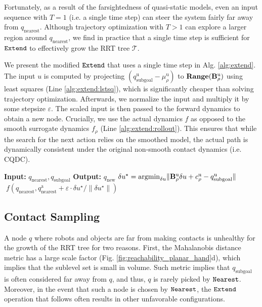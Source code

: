 Fortunately, as a result of the farsightedness of quasi-static models, even an input sequence with $T = 1$ (i.e. a single time step) can steer the system fairly far away from $q_{\mathrm{nearest}}$. Although trajectory optimization with $T > 1$ can explore a larger region around $q_{\mathrm{nearest}}$, we find in practice that a single time step is sufficient for $\mathtt{Extend}$ to effectively grow the RRT tree $\mathcal{T}$.

We present the modified $\mathtt{Extend}$ that uses a single time step in Alg. \ref{alg:extend}. The input $u$ is computed by projecting $(q^\mathrm{u}_{\mathrm{subgoal}} - \mu_\rho^\mathrm{u})$ to $\mathbf{Range}(\mathbf{B}^\mathrm{u}_\rho)$ using least squares (Line \ref{alg:extend:lstsq}), which is significantly cheaper than solving trajectory optimization. Afterwards, we normalize the input and multiply it by some stepsize $\varepsilon$. The scaled input is then passed to the forward dynamics to obtain a new node. Crucially, we use the actual dynamics $f$ as opposed to the smooth surrogate dynamics $f_\rho$ (Line \ref{alg:extend:rollout}). This ensures that while the search for the next action relies on the smoothed model, the actual path is dynamically consistent under the original non-smooth contact dynamics (i.e. CQDC). 

\begin{algorithm}
\caption{$\mathtt{Extend}$}\label{alg:extend}
\textbf{Input:} $q_{\mathrm{nearest}}, q_{\mathrm{subgoal}}$\;  \textbf{Output:} $q_{\mathrm{new}}$\;
$\delta u^\star = \mathrm{argmin}_{\delta u} \|\mathbf{B}^\mathrm{u}_\rho \delta u + c_\rho^\mathrm{u} - q_{\mathrm{subgoal}}^\mathrm{u} \|$ \label{alg:extend:lstsq} \;
\algorithmicreturn  $\; f(q_{\mathrm{nearest}}, q_{\mathrm{nearest}}^\mathrm{a} + \varepsilon \cdot \delta u^\star / \|\delta u^\star\|)$ \label{alg:extend:rollout}\;
\end{algorithm}


\subsection{Contact Sampling}\label{sec:contactsampling}
A node $q$ where robots and objects are far from making contacts is unhealthy for the growth of the RRT tree for two reasons. First, the Mahalanobis distance metric has a large scale factor (Fig. \ref{fig:reachability_planar_hand}d), which implies that the sublevel set is small in volume. Such metric implies that $q_\mathrm{subgoal}$ is often considered far away from $q$, and thus, $q$ is rarely picked by $\mathtt{Nearest}$. Moreover, in the event that such a node is chosen by $\mathtt{Nearest}$, the $\mathtt{Extend}$ operation that follows often results in other unfavorable configurations.

